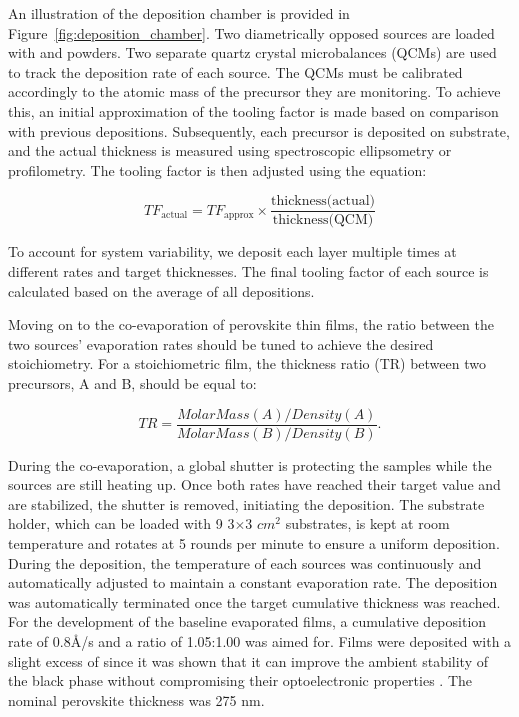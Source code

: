 An illustration of the deposition chamber is provided in Figure~\ref{fig:deposition_chamber}. Two diametrically opposed sources are loaded with  and  powders. Two separate quartz crystal microbalances (QCMs) are used to track the deposition rate of each source. The QCMs must be calibrated accordingly to the atomic mass of the precursor they are monitoring. To achieve this, an initial approximation of the tooling factor is made based on comparison with previous depositions. Subsequently, each precursor is deposited on  substrate, and the actual thickness is measured using spectroscopic ellipsometry or profilometry. The tooling factor is then adjusted using the equation: 

\begin{equation}
    TF_{\text{actual}} = TF_{\text{approx}} \times \frac{\text{thickness(actual)}}{\text{thickness(QCM)}}
\end{equation}

To account for system variability, we deposit each layer multiple times at different rates and target thicknesses. The final tooling factor of each source is calculated based on the average of all depositions.


Moving on to the co-evaporation of perovskite thin films, the ratio between the two sources' evaporation rates should be tuned to achieve the desired stoichiometry. For a stoichiometric film, the thickness ratio (TR) between two precursors, A and B, should be equal to: 

\begin{equation}
    TR = \frac{MolarMass(A)/Density(A)}{MolarMass(B)/Density(B)}.
\end{equation}

During the co-evaporation, a global shutter is protecting the samples while the sources are still heating up. Once both rates have reached their target value and are stabilized, the shutter is removed, initiating the deposition. The substrate holder, which can be loaded with 9 3$\times$3 $cm^2$ substrates, is kept at room temperature and rotates at 5 rounds per minute to ensure a uniform deposition. During the deposition, the temperature of each sources was continuously and automatically adjusted to maintain a constant evaporation rate. The deposition was automatically terminated once the target cumulative thickness was reached. For the development of the baseline evaporated films, a cumulative deposition rate of 0.8{\AA}/s and a  ratio of 1.05:1.00 was aimed for. Films were deposited with a slight excess of  since it was shown that it can improve the ambient stability of the black phase without compromising their optoelectronic properties \cite{Ma2017TheCells}. The nominal perovskite thickness was 275 nm. 

